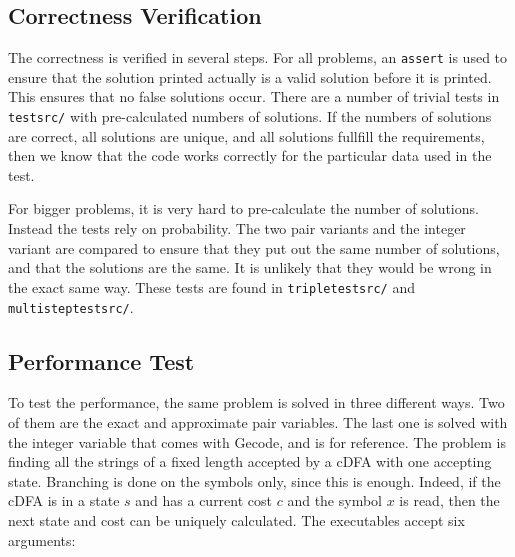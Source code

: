 \documentclass[a4paper,11pt]{article}
\begin{document}
\subsection{Correctness Verification}
The correctness is verified in several steps. For all problems, an \texttt{assert} is used to ensure that the solution printed actually is a valid solution before it is printed. This ensures that no false solutions occur. There are a number of trivial tests in \texttt{testsrc/} with pre-calculated numbers of solutions. If the numbers of solutions are correct, all solutions are unique, and all solutions fullfill the requirements, then we know that the code works correctly for the particular data used in the test.

For bigger problems, it is very hard to pre-calculate the number of solutions. Instead the tests rely on probability. The two pair variants and the integer variant are compared to ensure that they put out the same number of solutions, and that the solutions are the same. It is unlikely that they would be wrong in the exact same way. These tests are found in \texttt{tripletestsrc/} and \texttt{multisteptestsrc/}.

\subsection{Performance Test}
\label{sec:performancetest}
To test the performance, the same problem is solved in three different ways. Two of them are the exact and approximate pair variables. The last one is solved with the integer variable that comes with Gecode, and is for reference. The problem is finding all the strings of a fixed length accepted by a cDFA with one accepting state. Branching is done on the symbols only, since this is enough. Indeed, if the cDFA is in a state $s$ and has a current cost $c$ and the symbol $x$ is read, then the next state and cost can be uniquely calculated. The executables accept six arguments: 
\end{document}
